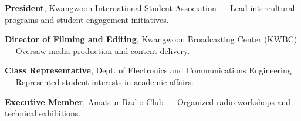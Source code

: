\documentclass[11pt, letterpaper]{awesome-cv}
\begin{document}
\begin{cvparagraph}
\textbf{President}, Kwangwoon International Student Association --- Lead intercultural programs and student engagement initiatives.

\textbf{Director of Filming and Editing}, Kwangwoon Broadcasting Center (KWBC) --- Oversaw media production and content delivery.

\textbf{Class Representative}, Dept. of Electronics and Communications Engineering --- Represented student interests in academic affairs.

\textbf{Executive Member}, Amateur Radio Club --- Organized radio workshops and technical exhibitions.
\end{cvparagraph}
\end{document}
